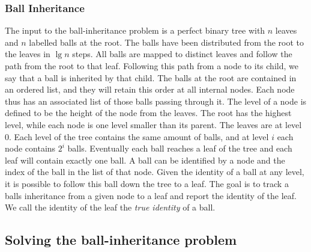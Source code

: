 

\subsubsection{Ball Inheritance}
\label{ssect:ballinheritance}
The input to the ball-inheritance problem is a perfect binary tree with $n$ leaves and $n$ labelled balls at the root. The balls have been distributed from the root to the leaves in $\lg n$ steps. All balls are mapped to distinct leaves and follow the path from the root to that leaf. Following this path from a node to its child, we say that a ball is inherited by that child. The balls at the root are contained in an ordered list, and they will retain this order at all internal nodes. Each node thus has an associated list of those balls passing through it. The level of a node is defined to be the height of the node from the leaves. The root has the highest level, while each node is one level smaller than its parent. The leaves are at level $0$. Each level of the tree contains the same amount of balls, and at level $i$ each node contains $2^i$ balls. Eventually each ball reaches a leaf of the tree and each leaf will contain exactly one ball. A ball can be identified by a node and the index of the ball in the list of that node. Given the identity of a ball at any level, it is possible to follow this ball down the tree to a leaf. The goal is to track a balls inheritance from a given node to a leaf and report the identity of the leaf. We call the identity of the leaf the \emph{true identity} of a ball. 

\subsection{Solving the ball-inheritance problem} 
\label{ssection:solving-ball}

